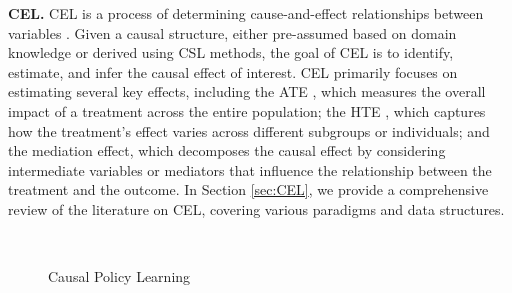 \textbf{\acrlong{CEL}.} \acrshort{CEL} is a process of determining cause-and-effect relationships between variables \citep{pearl2003statistics,pearl2009causal}. Given a causal structure, either pre-assumed based on domain knowledge or derived using \acrshort{CSL} methods, the goal of \acrshort{CEL} is to identify, estimate, and infer the causal effect of interest. \acrshort{CEL} primarily focuses on estimating several key effects, including the \acrfull{ATE} \citep{hirano2003efficient,imbens2004nonparametric}, which measures the overall impact of a treatment across the entire population; the \acrfull{HTE} \citep{wager2018estimation,curth2021nonparametric}, which captures how the treatment's effect varies across different subgroups or individuals; and the mediation effect, which decomposes the causal effect by considering intermediate variables or mediators \citep{vanderweele2016mediation} that influence the relationship between the treatment and the outcome. In Section \ref{sec:CEL}, we provide a comprehensive review of the literature on \acrshort{CEL}, covering various paradigms and data structures.

\begin{figure}[t!]
        \hfill
        \\
        \hfill
        
        \caption{Causal Policy Learning}
        \label{Fig:CPL}
\end{figure}

